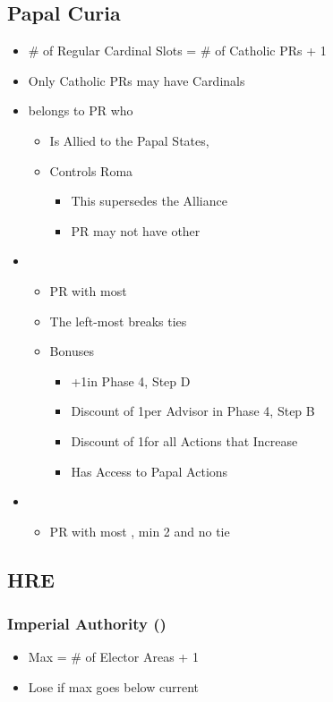 \documentclass[10pt]{article}
\begin{document}
\subsection*{Papal Curia }
\begin{itemize}
	\item \# of Regular Cardinal Slots = \# of Catholic PRs + 1
	\item Only Catholic PRs may have Cardinals
	\item {} belongs to PR who
	\begin{itemize}
		\item Is Allied to the \guilsinglright Papal States, 
		\item Controls Roma
		\begin{itemize}
			\item This supersedes the Alliance
			\item PR may not have other \cardinals
		\end{itemize}
	\end{itemize}
	\item {}
	\begin{itemize}
		\item PR with most \cardinals
		\item The left-most \cardinal breaks ties
		\item Bonuses
		\begin{itemize}
			\item +1\diplopower in Phase 4, Step D
			\item Discount of 1\ducat per Advisor in Phase 4, Step B
			\item Discount of 1\adminpower for all Actions that Increase \stability
			\item Has Access to Papal Actions
		\end{itemize}
	\end{itemize}
	\item {}
	\begin{itemize}
		\item PR with most \cardinals, min 2 and no tie
	\end{itemize}
\end{itemize}

\subsection*{HRE }
\subsubsection*{Imperial Authority (\authority) }
\begin{itemize}
	\item Max \authority = \# of Elector Areas + 1
	\item Lose \authority if max \authority goes below current \authority
\end{itemize}
\end{document}
